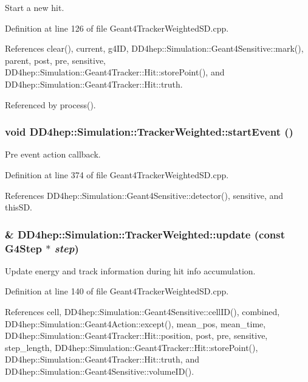 Start a new hit. 

Definition at line 126 of file Geant4TrackerWeightedSD.cpp.

References clear(), current, g4ID, DD4hep::Simulation::Geant4Sensitive::mark(), parent, post, pre, sensitive, DD4hep::Simulation::Geant4Tracker::Hit::storePoint(), and DD4hep::Simulation::Geant4Tracker::Hit::truth.

Referenced by process().\hypertarget{struct_d_d4hep_1_1_simulation_1_1_tracker_weighted_a15fd630fa0e1ca7e3c0516952ad5f976}{
\subsubsection[{startEvent}]{\setlength{\rightskip}{0pt plus 5cm}void DD4hep::Simulation::TrackerWeighted::startEvent ()}}
\label{struct_d_d4hep_1_1_simulation_1_1_tracker_weighted_a15fd630fa0e1ca7e3c0516952ad5f976}


Pre event action callback. 

Definition at line 374 of file Geant4TrackerWeightedSD.cpp.

References DD4hep::Simulation::Geant4Sensitive::detector(), sensitive, and thisSD.\hypertarget{struct_d_d4hep_1_1_simulation_1_1_tracker_weighted_a8ffc0941260d20698a82015cd39cf744}{
\subsubsection[{update}]{\& DD4hep::Simulation::TrackerWeighted::update (const G4Step $\ast$ {\em step})}}
\label{struct_d_d4hep_1_1_simulation_1_1_tracker_weighted_a8ffc0941260d20698a82015cd39cf744}


Update energy and track information during hit info accumulation. 

Definition at line 140 of file Geant4TrackerWeightedSD.cpp.

References cell, DD4hep::Simulation::Geant4Sensitive::cellID(), combined, DD4hep::Simulation::Geant4Action::except(), mean\_\-pos, mean\_\-time, DD4hep::Simulation::Geant4Tracker::Hit::position, post, pre, sensitive, step\_\-length, DD4hep::Simulation::Geant4Tracker::Hit::storePoint(), DD4hep::Simulation::Geant4Tracker::Hit::truth, and DD4hep::Simulation::Geant4Sensitive::volumeID().

